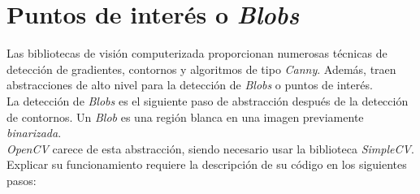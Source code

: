 \section{Puntos de interés o \emph{Blobs}}\label{tecnica:blobs}
Las bibliotecas de visión computerizada proporcionan numerosas
técnicas de detección de gradientes, contornos y algoritmos de tipo
\emph{Canny}. Además, traen abstracciones de alto nivel para la
detección de \emph{Blobs} o puntos de interés. \\
La detección de \emph{Blobs} es el siguiente paso de abstracción
después de la detección de contornos. Un \emph{Blob} es una región
blanca en una imagen previamente \emph{binarizada}. \\
\emph{OpenCV} carece de esta abstracción, siendo necesario usar la
biblioteca \emph{SimpleCV}. Explicar su funcionamiento requiere la
descripción de su código en los siguientes pasos:

